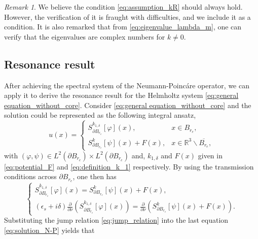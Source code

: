 \documentclass[11pt,reqno,twoside]{amsart}
\theoremstyle{definition}
\theoremstyle{remark}
\newtheorem{rem}{Remark}[section]
\numberwithin{equation}{section}
\begin{document}
\begin{rem}\label{rem:lll1}
We believe the condition \eqref{eq:assumption_kR} should always hold. However, the verification of it is fraught with difficulties, and we include it as a condition. It is also remarked that from \eqref{eq:eigenvalue_lambda_m}, one can verify that the eigenvalues are complex numbers for $k\neq 0$.
\end{rem}


\subsection{Resonance result}
After achieving the spectral system of the Neumann-Poinc\'are operator, we can apply it to derive the resonance result for the Helmholtz system \eqref{eq:general equation_without_core}. Consider \eqref{eq:general equation_without_core} and the solution could be represented as the following integral ansatz, 
\begin{equation}
  u(x)=\left\{
         \begin{array}{ll}
           S_{\partial B_{r_e}}^{k_{1,\delta}}[\varphi](x), & x\in B_{r_e}, \\
           S_{\partial B_{r_e}}^{k}[\psi](x) + F(x), & x\in \mathbb{R}^3\backslash \overline{B_{r_e}},
         \end{array}
       \right.
\end{equation}
with $(\varphi,\psi)\in L^2(\partial B_{r_e})\times L^2(\partial B_{r_e})$ and, $k_{1,\delta}$ and $F(x)$ given in \eqref{eq:potential_F} and \eqref{eq:definition_k_1} respectively.
By using the transmission conditions across $\partial B_{r_e}$, one then has
\begin{equation}\label{eq:solution_N-P}
  \left\{
    \begin{array}{ll}
      S_{\partial B_{r_e}}^{k_{1,\delta}}[\varphi](x) = S_{\partial B_{r_e}}^{k}[\psi](x) + F(x), \\
      (\epsilon_s+i\delta)\frac{\partial}{\partial\nu}\left(S_{\partial B_{r_e}}^{k_{1,\delta}}[\varphi](x)\right) = \frac{\partial}{\partial\nu}\left(S_{\partial B_{r_e}}^{k}[\psi](x) + F(x)\right).
    \end{array}
  \right.
\end{equation}
Substituting the jump relation \eqref{eq:jump_relation} into the last equation \eqref{eq:solution_N-P} yields that
\end{document}
